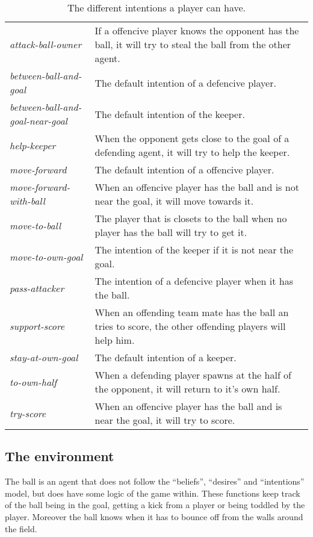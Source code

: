 \documentclass{article}
\begin{document}
\begin{table}
\centering
\caption{The different intentions a player can have.}
\label{tab:intentions}
\begin{tabular}{l p{} }
{\em attack-ball-owner} & If a offencive player knows the opponent has the ball, it will try to steal the ball from the other agent. \\
{\em between-ball-and-goal} & The default intention of a defencive player. \\
{\em between-ball-and-goal-near-goal} & The default intention of the keeper. \\
{\em help-keeper} & When the opponent gets close to the goal of a defending agent, it will try to help the keeper. \\
{\em move-forward} & The default intention of a offencive player. \\
{\em move-forward-with-ball} & When an offencive player has the ball and is not near the goal, it will move towards it. \\
{\em move-to-ball} & The player that is closets to the ball when no player has the ball will try to get it.\\
{\em move-to-own-goal} & The intention of the keeper if it is not near the goal. \\ 
{\em pass-attacker} & The intention of a defencive player when it has the ball. \\
{\em support-score} & When an offending team mate has the ball an tries to score, the other offending players will help him. \\
{\em stay-at-own-goal} & The default intention of a keeper. \\ 
{\em to-own-half} & When a defending player spawns at the half of the opponent, it will return to it's own half.\\
{\em try-score} & When an offencive player has the ball and is near the goal, it will try to score.
\end{tabular}
\end{table}

\subsection{The environment}
The ball is an agent that does not follow the ``beliefs'', ``desires'' and ``intentions'' model, but does have some logic of the game within.
These functions keep track of the ball being in the goal, getting a kick from a player or being toddled by the player.
Moreover the ball knows when it has to bounce off from the walls around the field.
\end{document}
